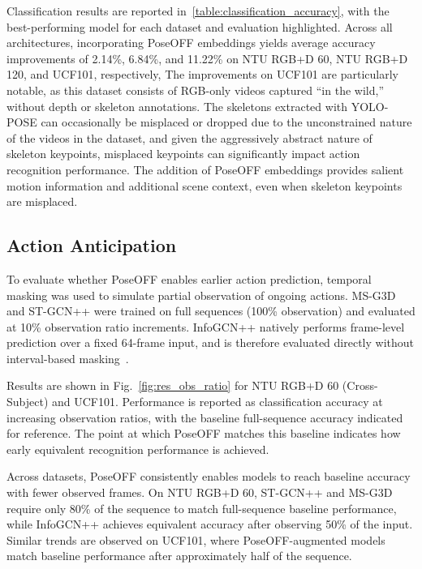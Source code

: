 \documentclass[letterpaper, 10 pt, conference]{ieeeconf}
\begin{document}
Classification results are reported in~\autoref{table:classification_accuracy}, with the best-performing model for each dataset and evaluation highlighted.
Across all architectures, incorporating PoseOFF embeddings yields average accuracy improvements of 2.14\%, 6.84\%, and 11.22\% on NTU RGB+D 60, NTU RGB+D 120, and UCF101, respectively,
The improvements on UCF101 are particularly notable, as this dataset consists of RGB-only videos captured “in the wild,” without depth or skeleton annotations.
The skeletons extracted with YOLO-POSE can occasionally be misplaced or dropped due to the unconstrained nature of the videos in the dataset, and given the aggressively abstract nature of skeleton keypoints, misplaced keypoints can significantly impact action recognition performance.
The addition of PoseOFF embeddings provides salient motion information and additional scene context, even when skeleton keypoints are misplaced.


\subsection{Action Anticipation}%
\label{subsec:exp_action_anticipation}

To evaluate whether PoseOFF enables earlier action prediction, temporal masking was used to simulate partial observation of ongoing actions. MS-G3D and ST-GCN++ were trained on full sequences (100\% observation) and evaluated at 10\% observation ratio increments. InfoGCN++ natively performs frame-level prediction over a fixed 64-frame input, and is therefore evaluated directly without interval-based masking~\cite{chi2025InfoGCNLearningRepresentationPredictingFutureOnlineSkeletonBasedActionRecognition}.

Results are shown in Fig.~\ref{fig:res_obs_ratio} for NTU RGB+D 60 (Cross-Subject) and UCF101. Performance is reported as classification accuracy at increasing observation ratios, with the baseline full-sequence accuracy indicated for reference. The point at which PoseOFF matches this baseline indicates how early equivalent recognition performance is achieved.

Across datasets, PoseOFF consistently enables models to reach baseline accuracy with fewer observed frames. On NTU RGB+D 60, ST-GCN++ and MS-G3D require only 80\% of the sequence to match full-sequence baseline performance, while InfoGCN++ achieves equivalent accuracy after observing 50\% of the input. Similar trends are observed on UCF101, where PoseOFF-augmented models match baseline performance after approximately half of the sequence.
\end{document}
